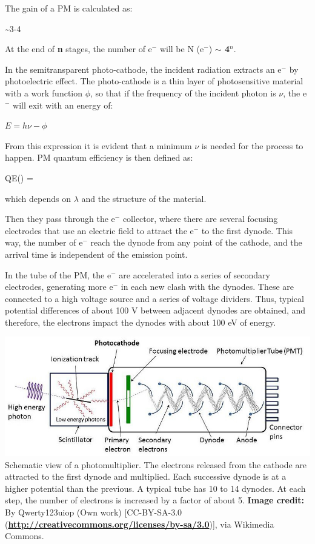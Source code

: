 		The gain of a PM is calculated as:

		\be{} \sim 3-4\ee

At the end of \textbf{n} stages, the number of e$^-$ will be N (e$^-$) \textbf{$\sim$ 4$^n$}.

		In the semitransparent photo-cathode, the incident radiation extracts an e$^-$ by photoelectric effect. The photo-cathode is a thin layer of photosensitive material with a work function $\phi$, so that if the frequency of the incident photon is $\nu$, the e$^-$ will exit with an energy of:

	\bc$E = h\nu - \phi$\ec

From this expression it is evident that a minimum $\nu$ is needed for the process to happen. PM quantum efficiency is then defined as:

	\be QE(\lambda) = \ee

which depends on $\lambda$ and the structure of the material.

		Then they pass through the e$^-$ collector, where there are several focusing electrodes that use an electric field to attract the e$^-$ to the first dynode. This way, the number of e$^-$ reach the dynode from any point of the cathode, and the arrival time is independent of the emission point.

		In the tube of the PM, the e$^-$ are accelerated into a series of secondary electrodes, generating more e$^-$ in each new clash with the dynodes. These are connected to a high voltage source and a series of voltage dividers. Thus, typical potential differences of about 100 V between adjacent dynodes are obtained, and therefore, the electrons impact the dynodes with about 100 eV of energy.

	\bfi[H]
		\bc
			\includegraphics[width=\textwidth]{img/pmtube.jpg}\\[12pt]
			\caption[Schematic view of a photomultiplier.]{Schematic view of a photomultiplier. The electrons released from the cathode are attracted to the first dynode and multiplied. Each successive dynode is at a higher potential than the previous. A typical tube has 10 to 14 dynodes. At each step, the number of electrons is increased by a factor of about 5. \textbf{Image credit:} By Qwerty123uiop (Own work) [CC-BY-SA-3.0 (\scriptsize\href{http://creativecommons.org/licenses/by-sa/3.0}{\textbf{\url{http://creativecommons.org/licenses/by-sa/3.0}}}{\small)], via Wikimedia Commons.}}\label{fig:pmtube}
		\ec
	\efi

